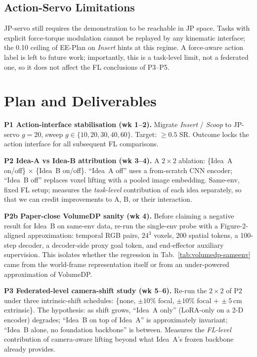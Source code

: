 \documentclass{article}
\begin{document}
\subsection{Action-Servo Limitations}
\label{sec:disc-servo}
JP-servo still requires the demonstration to be reachable in JP
space. Tasks with explicit force-torque modulation cannot be
replayed by any kinematic interface; the 0.10 ceiling of EE-Plan on
\emph{Insert} hints at this regime. A force-aware action label is
left to future work; importantly, this is a task-level limit, not a
federated one, so it does not affect the FL conclusions of P3--P5.

\section{Plan and Deliverables}
\label{sec:plan}

\textbf{P1 Action-interface stabilisation (wk 1--2).} Migrate
\emph{Insert} / \emph{Scoop} to JP-servo $g\!=\!20$, sweep
$g\!\in\!\{10,20,30,40,60\}$. Target: $\geq\!0.5$ SR. Outcome
locks the action interface for all subsequent FL comparisons.

\textbf{P2 Idea-A vs Idea-B attribution (wk 3--4).} A
$2\!\times\!2$ ablation:
\{Idea~A on/off\} $\times$ \{Idea~B on/off\}. ``Idea~A off'' uses
a from-scratch CNN encoder; ``Idea~B off'' replaces voxel lifting
with a pooled image embedding. Same-env, fixed FL setup; measures
the \emph{task-level} contribution of each idea separately, so
that we can credit improvements to A, B, or their interaction.

\textbf{P2b Paper-close VolumeDP sanity (wk 4).} Before claiming a
negative result for Idea~B on same-env data, re-run the single-env
probe with a Figure-2-aligned approximation: temporal RGB pairs,
$24^3$ voxels, 200 spatial tokens, a 100-step decoder, a
decoder-side proxy goal token, and end-effector auxiliary
supervision. This isolates whether the regression in
Tab.~\ref{tab:volumedp-sameenv} came from the world-frame
representation itself or from an under-powered approximation of
VolumeDP.

\textbf{P3 Federated-level camera-shift study (wk 5--6).}
Re-run the $2\!\times\!2$ of P2 under three intrinsic-shift
schedules: \{none, $\pm10\%$ focal, $\pm10\%$ focal $+\,\pm\!5\,$cm
extrinsic\}. The hypothesis: as shift grows,
``Idea~A only'' (LoRA-only on a 2-D encoder) degrades; ``Idea~B
on top of Idea~A'' is approximately invariant; ``Idea~B alone, no
foundation backbone'' is between. Measures the \emph{FL-level}
contribution of camera-aware lifting beyond what Idea~A's frozen
backbone already provides.
\end{document}
